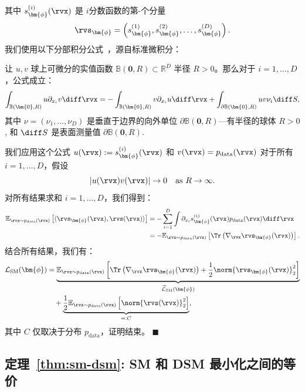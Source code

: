         其中 $s_{\bm{\phi}}^{(i)}(\rvx)$ 是 $i$分数函数的第-个分量
        \[
        \rvs_{\bm{\phi}} = \left( s_{\bm{\phi}}^{(1)}, s_{\bm{\phi}}^{(2)}, \dots, s_{\bm{\phi}}^{(D)} \right).
        \]
        我们使用以下分部积分公式~\citep{evans10}，源自标准微积分：
        \begin{lemma*}
            让 $u, v$ 球上可微分的实值函数 $\mathbb{B}(\bm{0}, R) \subset \mathbb{R}^D$ 半径 $R>0$。那么对于 $i = 1, \ldots, D$，公式成立：
        \[
        \int_{\mathbb{B}(\bm{0}, R)} u   \partial_{x_i} v   \diff \rvx = -\int_{\mathbb{B}(\bm{0}, R)} v   \partial_{x_i} u   \diff \rvx + \int_{\partial \mathbb{B}(\bm{0}, R)} u v \nu_i   \diff S,
        \]
        其中 $\nu = (\nu_1, \ldots, \nu_D)$ 是垂直于边界的向外单位 $\partial \mathbb{B}(\bm{0}, R)$---有半径的球体 $R>0$, 和 $\diff S$ 是表面测量值 $\partial \mathbb{B}(\bm{0}, R)$.
        \end{lemma*}
        我们应用这个公式 $u(\rvx) := s_{\bm{\phi}}^{(i)}(\rvx)$ 和 $v(\rvx) = p_{\text{data}}(\rvx)$ 对于所有 $i = 1, \dots, D$，假设
        \[
        |u(\rvx) v(\rvx)| \to 0 \quad \text{as } R \to \infty.
        \]
        对所有结果求和 $i = 1, \dots, D$，我们得到：
        \begin{align*}
            \mathbb{E}_{\rvx \sim p_{\text{data}}(\rvx)} \left[ \langle \rvs_{\bm{\phi}}(\rvx), \rvs(\rvx) \rangle \right]
             &= - \sum_{i=1}^{D} \int  \partial_{x_i}s_{\bm{\phi}}^{(i)}(\rvx) p_{\text{data}}(\rvx) \diff \rvx \\
             &= - \mathbb{E}_{\rvx \sim p_{\text{data}}(\rvx)} \left[\Tr\left(\nabla_{\rvx}\rvs_{\bm{\phi}}(\rvx)\right) \right].
        \end{align*}
        结合所有结果，我们有：
        \begin{align*}
        \mathcal{L}_{\text{SM}}(\bm{\phi}) &= \underbrace{\mathbb{E}_{\rvx \sim p_{\text{data}}(\rvx)} \left[\Tr\left(\nabla_{\rvx}\rvs_{\bm{\phi}}(\rvx)\right) + \frac{1}{2}  \norm{\rvs_{\bm{\phi}}(\rvx)}_2^2 \right]}_{\widetilde{\mathcal{L}}_{\text{SM}}(\bm{\phi})} \\
        &\quad + \underbrace{\frac{1}{2}\mathbb{E}_{\rvx \sim p_{\text{data}}(\rvx)} \left[ \norm{\rvs(\rvx)}_2^2 \right]}_{=:C},
        \end{align*}
        其中 $C$ 仅取决于分布 $p_{\text{data}}$，证明结束。
\hfill$\blacksquare$

\subsection{定理~\ref{thm:sm-dsm}: SM 和 DSM 最小化之间的等价}\label{app-sec:sm-dsm}
